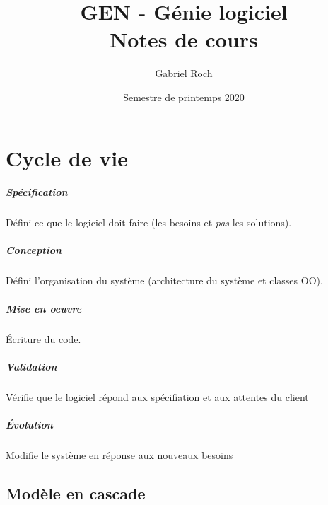 \documentclass[a4paper,11pt]{report}
\title{GEN - Génie logiciel\\Notes de cours}
\author{Gabriel Roch}
\date{Semestre de printemps 2020}
\begin{document}
\maketitle
\tableofcontents


\begin{abstract}
\end{abstract}

\chapter{Cycle de vie}
\paragraph{Spécification} Défini ce que le logiciel doit faire (les besoins et \emph{pas} les solutions).
\paragraph{Conception} Défini l’organisation du système (architecture du système et classes OO).
\paragraph{Mise en oeuvre} Écriture du code.
\paragraph{Validation} Vérifie que le logiciel répond aux spécifiation et aux attentes du client
\paragraph{Évolution} Modifie le système en réponse aux nouveaux besoins

\section{Modèle en cascade}
\end{document}

